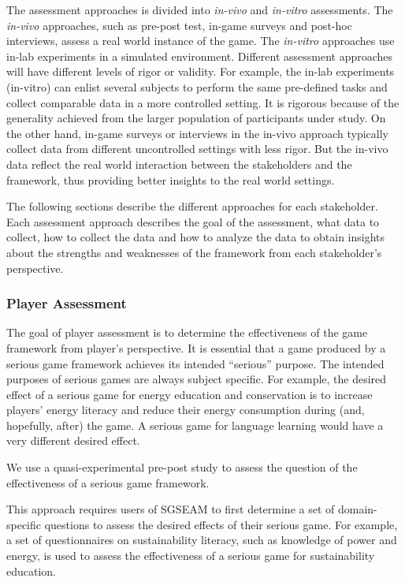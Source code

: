 The assessment approaches is divided into {\em in-vivo} and {\em in-vitro} assessments. The {\em in-vivo} approaches, 
such as pre-post test, in-game surveys and post-hoc interviews, assess a real world instance of the game. 
The {\em in-vitro} approaches use in-lab experiments in a simulated environment. Different assessment
approaches will have different levels of rigor or validity. For example, the in-lab experiments (in-vitro) can 
enlist several subjects to perform the same pre-defined tasks and collect comparable data in a more 
controlled setting. It is rigorous because of the generality achieved from the larger population of
participants under study. On the other hand, in-game surveys or interviews in the in-vivo approach typically 
collect data from different uncontrolled settings with less rigor. But the in-vivo data reflect the real world 
interaction between the stakeholders and the framework, thus providing better insights to the real world settings.

The following sections describe the different approaches for each stakeholder.  Each assessment 
approach describes the goal of the assessment, what data to collect, how to collect the data and how to 
analyze the data to obtain insights about the strengths and weaknesses of the framework from each 
stakeholder's perspective.

\subsubsection{Player Assessment}

The goal of player assessment is to determine the effectiveness of the game
framework from player's perspective. It is essential that a game produced by a serious game
framework achieves its intended ``serious'' purpose. The intended purposes of serious games are
always subject specific. For example, the desired effect of a serious game for
energy education and conservation is to increase players' energy literacy and
reduce their energy consumption during (and, hopefully, after) the game. A serious game for
language learning would have a very different desired effect.

\label{Pre-Post effectiveness study}

We use a quasi-experimental pre-post study to assess the question of the effectiveness of a serious game framework. 

This approach requires users of SGSEAM to first determine a set of domain-specific questions to assess the 
desired effects of their serious game. For example, a set of questionnaires on sustainability literacy, such as 
knowledge of power and energy, is used to assess the effectiveness of a serious game for sustainability education.

